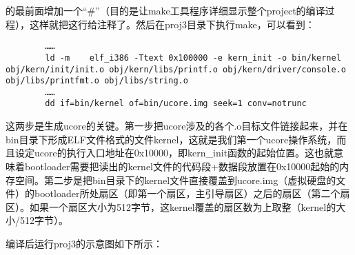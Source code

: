 的最前面增加一个``\#''（目的是让make工具程序详细显示整个project的编译过程），这样就把这行给注释了。然后在proj3目录下执行make，可以看到：

\begin{lstlisting}
        ……
        ld -m    elf_i386 -Ttext 0x100000 -e kern_init -o bin/kernel obj/kern/init/init.o obj/kern/libs/printf.o obj/kern/driver/console.o obj/libs/printfmt.o obj/libs/string.o
        ……
        dd if=bin/kernel of=bin/ucore.img seek=1 conv=notrunc
\end{lstlisting}

这两步是生成ucore的关键。第一步把ucore涉及的各个.o目标文件链接起来，并在bin目录下形成ELF文件格式的文件kernel，这就是我们第一个ucore操作系统，而且设定ucore的执行入口地址在0x10000，即kern\_init函数的起始位置。这也就意味着bootloader需要把读出的kernel文件的代码段+数据段放置在0x10000起始的内存空间。第二步是把bin目录下的kernel文件直接覆盖到ucore.img（虚拟硬盘的文件）的bootloader所处扇区（即第一个扇区，主引导扇区）之后的扇区（第二个扇区）。如果一个扇区大小为512字节，这kernel覆盖的扇区数为上取整（kernel的大小/512字节）。

编译后运行proj3的示意图如下所示：


